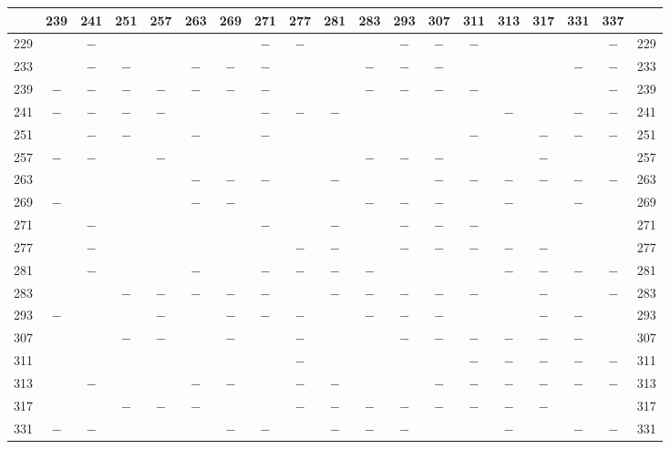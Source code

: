 \begin{center}\begingroup\fontsize{8}{10.5}\selectfont\setlength{\tabcolsep}{2pt}
\begin{tabular}{r|c|c|c|c|c|c|c|c|c|c|c|c|c|c|c|c|c|r}
\hline
 & 239 & 241 & 251 & 257 & 263 & 269 & 271 & 277 & 281 & 283 & 293 & 307 & 311 & 313 & 317 & 331 & 337 & \\
\hline
229 &  & $-$ &  &  &  &  & $-$ & $-$ &  &  & $-$ & $-$ & $-$ &  &  &  & $-$ & 229\\
233 &  & $-$ & $-$ &  & $-$ & $-$ & $-$ &  &  & $-$ & $-$ & $-$ &  &  &  & $-$ & $-$ & 233\\
239 & $-$ & $-$ & $-$ & $-$ & $-$ & $-$ & $-$ &  &  & $-$ & $-$ & $-$ & $-$ &  &  &  & $-$ & 239\\
241 & $-$ & $-$ & $-$ & $-$ &  &  & $-$ & $-$ & $-$ &  &  &  &  & $-$ &  & $-$ & $-$ & 241\\
251 &  & $-$ & $-$ &  & $-$ &  & $-$ &  &  &  &  &  & $-$ &  & $-$ & $-$ & $-$ & 251\\
257 & $-$ & $-$ &  & $-$ &  &  &  &  &  & $-$ & $-$ & $-$ &  &  & $-$ &  &  & 257\\
263 &  &  &  &  & $-$ & $-$ & $-$ &  & $-$ &  &  & $-$ & $-$ & $-$ & $-$ & $-$ & $-$ & 263\\
269 & $-$ &  &  &  & $-$ & $-$ &  &  &  & $-$ & $-$ & $-$ &  & $-$ &  & $-$ &  & 269\\
271 &  & $-$ &  &  &  &  & $-$ &  & $-$ &  & $-$ & $-$ & $-$ &  &  &  &  & 271\\
277 &  & $-$ &  &  &  &  &  & $-$ & $-$ &  & $-$ & $-$ & $-$ & $-$ & $-$ &  &  & 277\\
281 &  & $-$ &  &  & $-$ &  & $-$ & $-$ & $-$ & $-$ &  &  &  & $-$ & $-$ & $-$ & $-$ & 281\\
283 &  &  & $-$ & $-$ & $-$ & $-$ & $-$ &  & $-$ & $-$ & $-$ & $-$ & $-$ &  & $-$ &  & $-$ & 283\\
293 & $-$ &  &  & $-$ &  & $-$ & $-$ & $-$ &  & $-$ & $-$ & $-$ &  &  & $-$ & $-$ &  & 293\\
307 &  &  & $-$ & $-$ &  & $-$ &  & $-$ &  &  & $-$ & $-$ & $-$ & $-$ & $-$ & $-$ &  & 307\\
311 &  &  &  &  &  &  &  & $-$ &  &  &  &  & $-$ & $-$ & $-$ & $-$ & $-$ & 311\\
313 &  & $-$ &  &  & $-$ & $-$ &  & $-$ & $-$ &  &  & $-$ & $-$ & $-$ & $-$ & $-$ & $-$ & 313\\
317 &  &  & $-$ & $-$ & $-$ &  &  & $-$ & $-$ & $-$ & $-$ & $-$ & $-$ & $-$ & $-$ &  &  & 317\\
331 & $-$ & $-$ &  &  &  & $-$ & $-$ &  & $-$ & $-$ & $-$ &  &  & $-$ &  & $-$ & $-$ & 331\\

\end{tabular}
\end{center}
